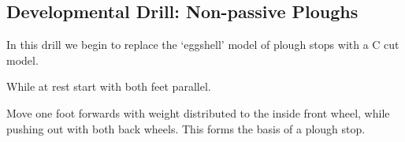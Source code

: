 \subsection{Developmental Drill: Non-passive Ploughs}
\label{sec:stopping/plough_one_foot/cuts}

In this drill we begin to replace the `eggshell' model of plough stops with a C cut model. 

While at rest start with both feet parallel. 

Move one foot forwards with weight distributed to the inside front wheel, while pushing out with both back wheels.  
This forms the basis of a plough stop.
